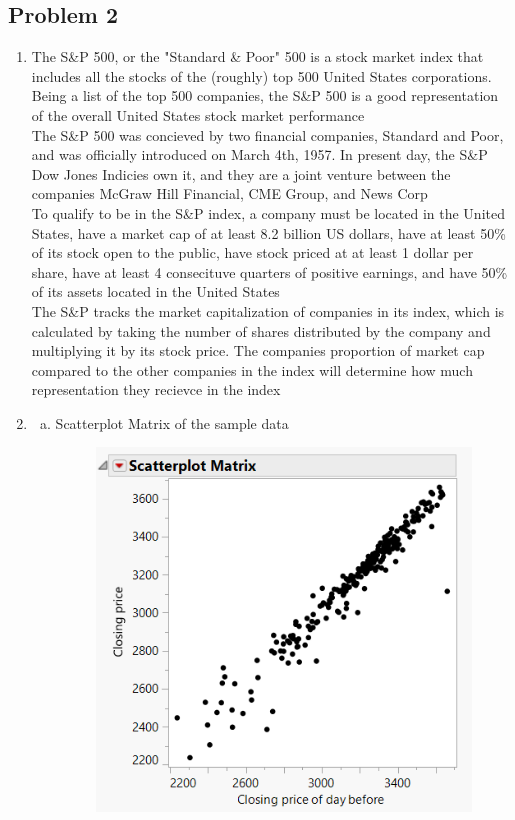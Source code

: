\documentclass[14pt]{article}
\begin{document}
\subsection*{Problem 2}
\begin{enumerate}
\item
The S\&P 500, or the "Standard \& Poor" 500 is a stock market index that includes all the stocks of the (roughly) top 500 United States corporations. Being a list of the top 500 companies, the S\&P 500 is a good representation of the overall United States stock market performance \\
The S\&P 500 was concieved by two financial companies, Standard and Poor, and was officially introduced on March 4th, 1957. In present day, the S\&P Dow Jones Indicies own it, and they are a joint venture between the companies McGraw Hill Financial, CME Group, and News Corp \\
To qualify to be in the S\&P index, a company must be located in the United States, have a market cap of at least 8.2 billion US dollars, have at least 50\% of its stock open to the public, have stock priced at at least 1 dollar per share, have at least 4 consecituve quarters of positive earnings, and have 50\% of its assets located in the United States \\
The S\&P tracks the market capitalization of companies in its index, which is calculated by taking the number of shares distributed by the company and multiplying it by its stock price. The companies proportion of market cap compared to the other companies in the index will determine how much representation they recievce in the index

\item

\pagebreak

\begin{enumerate}[(a)]
\item
Scatterplot Matrix of the sample data

\begin{figure}[h]
\includegraphics[scale=0.75]{exam3Pics/2-2-a.PNG}
\centering
\end{figure}


\end{enumerate}
\end{enumerate}
\end{document}
